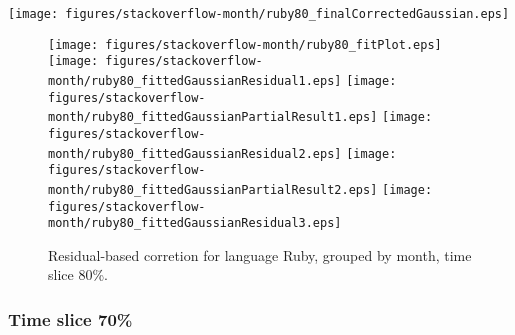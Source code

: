 \begin{center}
{\texttt{[image: figures/stackoverflow-month/ruby80\_finalCorrectedGaussian.eps]}}
\end{center}

\FloatBarrier

\begin{figure}[t]
\centering
{}
{\texttt{[image: figures/stackoverflow-month/ruby80\_fitPlot.eps]}}
{\texttt{[image: figures/stackoverflow-month/ruby80\_fittedGaussianResidual1.eps]}}
{\texttt{[image: figures/stackoverflow-month/ruby80\_fittedGaussianPartialResult1.eps]}}
{\texttt{[image: figures/stackoverflow-month/ruby80\_fittedGaussianResidual2.eps]}}
{\texttt{[image: figures/stackoverflow-month/ruby80\_fittedGaussianPartialResult2.eps]}}
{\texttt{[image: figures/stackoverflow-month/ruby80\_fittedGaussianResidual3.eps]}}
\caption{Residual-based corretion for language Ruby, grouped by month, time slice 80\%.}
\end{figure}


\FloatBarrier


\subsubsection{Time slice 70\%}

